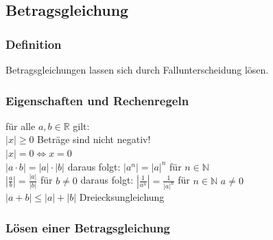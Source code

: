 \begin{multicols}{2}
    \subsection{Betragsgleichung}
    \vspace{-4mm}
    \subsubsection{Definition}
    \vspace{-4mm}
    Betragsgleichungen lassen sich durch Fallunterscheidung lösen.

    \subsubsection{Eigenschaften und Rechenregeln}
    \vspace{-4mm}
    für alle $a, b \in \mathbb{R}$ gilt: \\
    $|x| \geq 0$ Beträge sind nicht negativ! \\
    $|x| = 0 \Leftrightarrow x = 0$ \\
    $|a \cdot b| = |a| \cdot |b|$ daraus folgt: $|a^n| = |a|^n$ für $n \in \mathbb{N}$ \\
    $|\frac{a}{b}| = \frac{|a|}{|b|}$ für $b \neq 0$  daraus folgt: $|\frac{1}{a^n}| = \frac{1}{|a|^n}$ für $n \in \mathbb{N}$ $a \neq 0$ \\
    $ |a+b| \leq |a| + |b|$ Dreiecksungleichung

    \subsubsection{Lösen einer Betragsgleichung}
    \vspace{-4mm}


\end{multicols}

